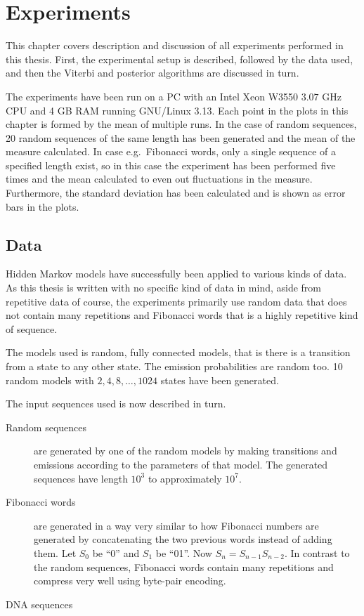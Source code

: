 \chapter{Experiments}

This chapter covers description and discussion of all experiments performed in
this thesis. First, the experimental setup is described, followed by the data
used, and then the Viterbi and posterior algorithms are discussed in turn.

The experiments have been run on a PC with an Intel Xeon W3550 $3.07$ GHz CPU
and 4 GB RAM running GNU/Linux 3.13. Each point in the plots in this chapter is
formed by the mean of multiple runs. In the case of random sequences, 20 random
sequences of the same length has been generated and the mean of the measure
calculated. In case e.g.\ Fibonacci words, only a single sequence of a
specified length exist, so in this case the experiment has been performed five
times and the mean calculated to even out fluctuations in the
measure. Furthermore, the standard deviation has been calculated and is shown
as error bars in the plots.

\section{Data}

Hidden Markov models have successfully been applied to various kinds of
data.  As this thesis is written with no specific kind of
data in mind, aside from repetitive data of course, the experiments primarily
use random data that does not contain many repetitions and Fibonacci words that
is a highly repetitive kind of sequence. 

The models used is random, fully connected models, that is there is a
transition from a state to any other state. The emission probabilities are
random too. 10 random models with $2, 4, 8, \dots, 1024$ states have been
generated.

The input sequences used is now described in turn.

\begin{description}
\item[Random sequences] are generated by one of the random models by making
  transitions and emissions according to the parameters of that model. The
  generated sequences have length $10^3$ to approximately $10^7$.
\item[Fibonacci words] are generated in a way very similar to how Fibonacci
  numbers are generated by concatenating the two previous words instead of
  adding them. Let $S_0$ be ``0'' and $S_1$ be ``01''. Now
  $S_n=S_{n-1}S_{n-2}$. In contrast to the random sequences, Fibonacci words
  contain many repetitions and compress very well using byte-pair
  encoding. 
\item[DNA sequences] 
\end{description}

